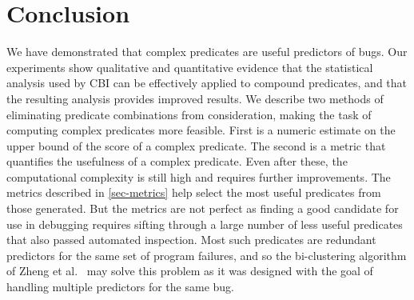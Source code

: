 
\section{Conclusion}
\label{sec-conclusion}
We have demonstrated that complex predicates are useful predictors of bugs.  
Our experiments show qualitative and quantitative evidence that the statistical 
analysis used by CBI can be effectively applied to compound predicates, and that
the resulting analysis provides improved results.  We describe
two methods of eliminating predicate combinations from consideration, making
the task of computing complex predicates more feasible.  First is a numeric 
estimate on the upper bound of the score of a complex predicate.  The second is 
a metric that quantifies the usefulness of a complex predicate.  Even after these, 
the computational complexity is still high and requires further improvements.  
The metrics described in \autoref{sec-metrics} help select the most useful predicates
from those generated.  But the metrics are not perfect as finding a good candidate
for use in debugging requires sifting through a large number of less useful predicates
that also passed automated inspection.  Most such predicates are redundant predictors
for the same set of program failures, and so the bi-clustering algorithm of Zheng et al.\ 
\cite{Zheng:2006:SDSIMB} may solve this problem as it was designed with the goal 
of handling multiple predictors for the same bug.
